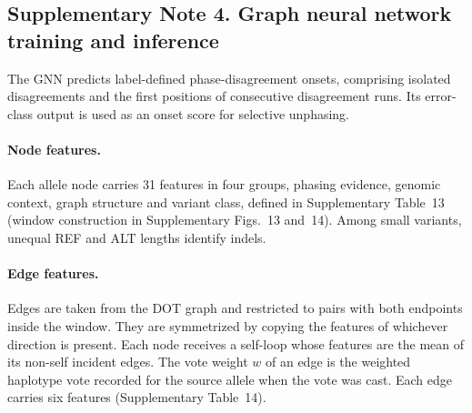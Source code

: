 \documentclass[11pt,a4paper]{article}
\begin{document}
\subsection*{Supplementary Note 4. Graph neural network training and inference}

The GNN predicts label-defined phase-disagreement onsets, comprising isolated disagreements and the first positions of consecutive disagreement runs. Its error-class output is used as an onset score for selective unphasing.

\paragraph{Node features.} Each allele node carries 31 features in four groups, phasing evidence, genomic context, graph structure and variant class, defined in Supplementary Table~13 (window construction in Supplementary Figs.~13 and~14). Among small variants, unequal REF and ALT lengths identify indels.

\paragraph{Edge features.} Edges are taken from the DOT graph and restricted to pairs with both endpoints inside the window. They are symmetrized by copying the features of whichever direction is present. Each node receives a self-loop whose features are the mean of its non-self incident edges. The vote weight $w$ of an edge is the weighted haplotype vote recorded for the source allele when the vote was cast. Each edge carries six features (Supplementary Table~14).
\end{document}
